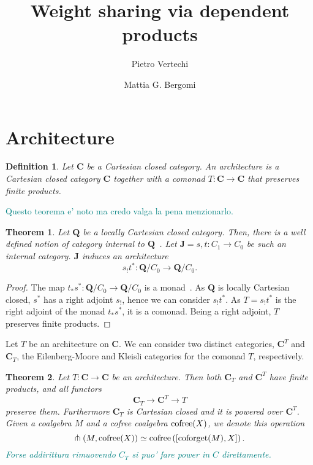 \documentclass[12pt]{article}
\title{Weight sharing via dependent products}
\author{
    Pietro Vertechi \and Mattia G. Bergomi
}
\date{}
\newtheorem{theorem}{Theorem}
\newtheorem{definition}{Definition}
\newcommand{\pietro}[1]{\textcolor{teal}{#1}}
\newcommand{\coforget}{{\textnormal{coforget}}}
\newcommand{\cofree}{{\textnormal{cofree}}}
\newcommand{\Cat}{{\mathbf{C}}}
\newcommand{\JCat}{{\mathbf{J}}}
\newcommand{\QCat}{{\mathbf{Q}}}
\begin{document}
\maketitle
\begin{abstract}
\end{abstract}

\section{Architecture}

\begin{definition}\label{def:architecture}
    Let $\Cat$ be a Cartesian closed category. An {\em architecture} is a Cartesian closed category $\Cat$ together with a comonad $T\colon \Cat \rightarrow \Cat$ that preserves finite products.
\end{definition}

\pietro{Questo teorema e' noto ma credo valga la pena menzionarlo.}

\begin{theorem}\label{thm:categorical_architecture}
    Let $\QCat$ be a locally Cartesian closed category. Then, there is a well defined notion of category {\em internal} to $\QCat$~\cite{mac2013categories}.
    Let $\JCat = s, t \colon C_1 \rightarrow C_0$ be such an internal category. $\JCat$ induces an architecture
    \begin{equation*}
        s_!t^*\colon \QCat/C_0 \rightarrow \QCat/C_0.
    \end{equation*}
\end{theorem}

\begin{proof}
    The map $t_*s^*\colon \QCat/C_0 \rightarrow \QCat/C_0$ is a monad~\cite[Thm.~V.8.2]{Mac_Lane_1994}. As $\QCat$ is locally Cartesian closed, $s^*$ has a right adjoint $s_!$, hence we can consider $s_!t^*$. As $T = s_!t^*$ is the right adjoint of the monad $t_*s^*$, it is a comonad. Being a right adjoint, $T$ preserves finite products.
\end{proof}

Let $T$ be an architecture on $\Cat$.
We can consider two distinct categories, $\Cat^T$ and $\Cat_T$, the Eilenberg-Moore and Kleisli categories for the comonad $T$, respectively.

\begin{theorem}\label{thm:cartesian_kleisli}
    Let $T\colon \Cat \rightarrow \Cat$ be an architecture. Then both $\Cat_T$ and $\Cat^T$ have finite products, and all functors
    \begin{equation*}
        \Cat_T \rightarrow \Cat^T \rightarrow T
    \end{equation*}
    preserve them. Furthermore $\Cat_T$ is Cartesian closed and it is powered over $\Cat^T$. Given a coalgebra $M$ and a cofree coalgebra $\cofree(X)$, we denote this operation
    \begin{equation*}
        \pitchfork(M, \cofree(X)) \simeq \cofree\left([\coforget(M), X]\right).
    \end{equation*}
    \pietro{Forse addirittura rimuovendo $C_T$ si puo' fare power in $C$ direttamente.}
\end{theorem}
\end{document}
